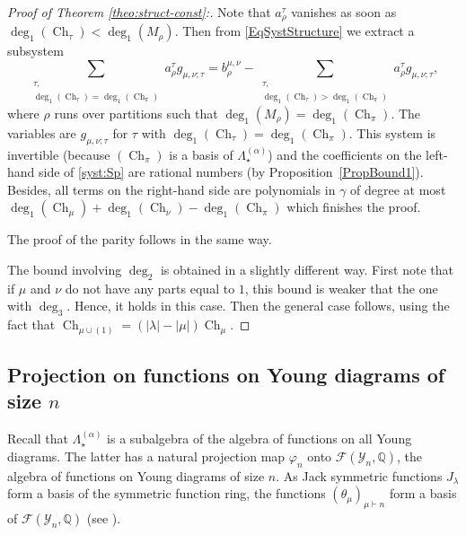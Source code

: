 \documentclass[11pt]{amsart}
\theoremstyle{plain}
\theoremstyle{remark}
\newcommand{\F}{\mathcal{F}}
\newcommand{\QQ}{\mathbb{Q}}
\newcommand{\Pola}{\Lambda_\star^{(\alpha)}}
\newcommand{\Young}{\mathcal{Y}}
\DeclareMathOperator{\Ch}{Ch}
\begin{document}
\begin{proof}[Proof of Theorem \ref{theo:struct-const}:]
    Note that $a_\rho^\tau$ vanishes as soon as $\deg_1(\Ch_\tau) < \deg_1(M_\rho)$.
    Then from \eqref{EqSystStructure} we extract a subsystem
    \begin{equation}                                          
        \sum_{\substack{\tau, \\ \deg_1(\Ch_\tau)=\deg_1(\Ch_{\pi})}} a_\rho^\tau g_{\mu,\nu;\tau} =
        b_\rho^{\mu,\nu} - \sum_{\substack{\tau, \\ \deg_1(\Ch_\tau)>\deg_1(\Ch_{\pi})}}
        a_\rho^\tau g_{\mu,\nu;\tau},      
        \tag{$S'$}
        \label{syst:Sp}
    \end{equation}
    where $\rho$ runs over partitions such that $\deg_1(M_\rho)=\deg_1(\Ch_\pi)$.
    The variables are $g_{\mu,\nu;\tau}$ for $\tau$ with $\deg_1(\Ch_\tau)=\deg_1(\Ch_{\pi})$.
    This system is invertible (because $(\Ch_\pi)$ is a basis of $\Pola$) and
    the coefficients on the left-hand side of
    \eqref{syst:Sp} are rational numbers (by Proposition~\ref{PropBound1}).
    Besides, all terms on the right-hand side are polynomials in $\gamma$ of degree
    at most $\deg_1(\Ch_\mu) + \deg_1(\Ch_\nu) - \deg_1(\Ch_\pi)$
    which finishes the proof.

    The proof of the parity follows in the same way.\medskip

    The bound involving $\deg_2$ is obtained in a slightly different way.
    First note that if $\mu$ and $\nu$ do not have any parts equal to $1$,
    this bound is weaker that the one with $\deg_3$.
    Hence, it holds in this case.
    Then the general case follows, using the fact that
    $\Ch_{\mu \cup (1)}=(|\lambda| - |\mu|)\Ch_\mu$.
\end{proof}




\subsection{Projection on functions on Young diagrams of size $n$}\label{SubsectProjN}
Recall that $\Pola$ is a subalgebra of the algebra of functions on all Young diagrams.
The latter has a natural projection map $\varphi_n$ onto $\F(\Young_n,\QQ)$, the algebra
of functions on Young diagrams of size $n$.
As Jack symmetric functions $J_\lambda$ form a basis of the symmetric function ring,
the functions $(\theta_\mu)_{\mu \vdash n}$ form a basis of $\F(\Young_n,\QQ)$
(see \cite[Proposition 4.1]{FerayInductionJM}).
\end{document}
